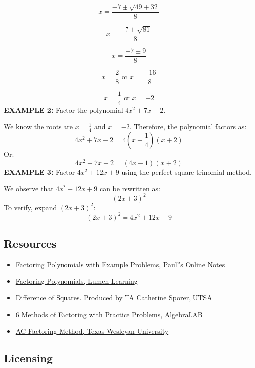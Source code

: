 \[
x = \frac{-7 \pm \sqrt{49 + 32}}{8}
\]

\[
x = \frac{-7 \pm \sqrt{81}}{8}
\]

\[
x = \frac{-7 \pm 9}{8}
\]

\[
x = \frac{2}{8} \text{ or } x = \frac{-16}{8}
\]

\[
x = \frac{1}{4} \text{ or } x = -2
\]
\textbf{EXAMPLE 2:} Factor the polynomial $4x^2 + 7x - 2$.

We know the roots are $x = \frac{1}{4}$ and $x = -2$. Therefore, the polynomial factors as:
\[
4x^2 + 7x - 2 = 4(x - \frac{1}{4})(x + 2)
\]
Or:
\[
4x^2 + 7x - 2 = (4x - 1)(x + 2)
\]
\textbf{EXAMPLE 3:} Factor $4x^2 + 12x + 9$ using the perfect square trinomial method.

We observe that $4x^2 + 12x + 9$ can be rewritten as:
\[
(2x + 3)^2
\]
To verify, expand $(2x + 3)^2$:
\[
(2x + 3)^2 = 4x^2 + 12x + 9
\]

\subsection{Resources}
\label{sss:reso-55b5}

\begin{itemize}
    \item \href{https://tutorial.math.lamar.edu/classes/alg/factoring.aspx}{Factoring Polynomials with Example Problems, Paul''s Online Notes}
    \item \href{https://courses.lumenlearning.com/suny-beginalgebra/chapter/5-2-1-factor-trinomials/}{Factoring Polynomials, Lumen Learning}
    \item \href{https://www.youtube.com/watch?v=shHS-ERFVrc}{Difference of Squares. Produced by TA Catherine Sporer, UTSA}
    \item \href{http://www.algebralab.org/lessons/lesson.aspx?file=algebra_factoring.xml}{6 Methods of Factoring with Practice Problems, AlgebraLAB}
    \item \href{https://txwes.edu/media/twu/content-assets/images/academics/academic-success-center/A-C-Method.pdf}{AC Factoring Method, Texas Wesleyan University}
\end{itemize}

\subsection{Licensing}
\label{sss:lice-7352}

